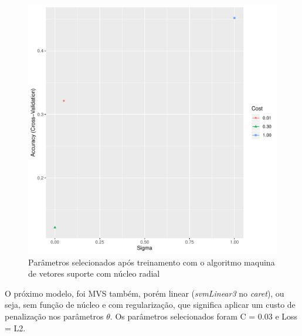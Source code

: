 \begin{figure}[H]
    \centering
    \caption{Parâmetros selecionados após treinamento com o algoritmo maquina de vetores suporte com núcleo radial} \label{fig-fluxograma}
    \includegraphics[scale=0.5]{figs/plot_svm-radial.pdf}
\end{figure}

	O próximo modelo, foi MVS também, porém linear (\emph{svmLinear3} no
\emph{caret}), ou seja, sem função de núcleo e com regularização, que
significa aplicar um custo de penalização nos parâmetros $\theta$. Os
parâmetros selecionados foram C = 0.03 e Loss = L2.

